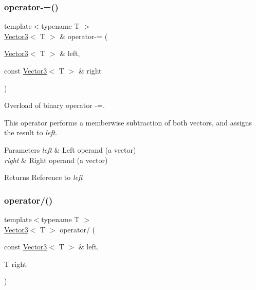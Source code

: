 \subsubsection{\texorpdfstring{operator-\/=()}{operator-=()}}
{\footnotesize\ttfamily template$<$typename T $>$ \\
\mbox{\hyperlink{classsf_1_1_vector3}{Vector3}}$<$ T $>$ \& operator-\/= (\begin{DoxyParamCaption}\item[{\mbox{\hyperlink{classsf_1_1_vector3}{Vector3}}$<$ T $>$ \&}]{left,  }\item[{const \mbox{\hyperlink{classsf_1_1_vector3}{Vector3}}$<$ T $>$ \&}]{right }\end{DoxyParamCaption})\hspace{0.3cm}{\ttfamily [related]}}



Overload of binary operator -\/=. 

This operator performs a memberwise subtraction of both vectors, and assigns the result to {\itshape left}.


\begin{DoxyParams}{Parameters}
{\em left} & Left operand (a vector) \\
\hline
{\em right} & Right operand (a vector)\\
\hline
\end{DoxyParams}
\begin{DoxyReturn}{Returns}
Reference to {\itshape left} \begin{DoxyVerb}\end{DoxyVerb}
 
\end{DoxyReturn}
\mbox{\label{classsf_1_1_vector3_ad4ba4a83de236ddeb92a7b759187e90d}} 
\subsubsection{\texorpdfstring{operator/()}{operator/()}}
{\footnotesize\ttfamily template$<$typename T $>$ \\
\mbox{\hyperlink{classsf_1_1_vector3}{Vector3}}$<$ T $>$ operator/ (\begin{DoxyParamCaption}\item[{const \mbox{\hyperlink{classsf_1_1_vector3}{Vector3}}$<$ T $>$ \&}]{left,  }\item[{T}]{right }\end{DoxyParamCaption})\hspace{0.3cm}{\ttfamily [related]}}



